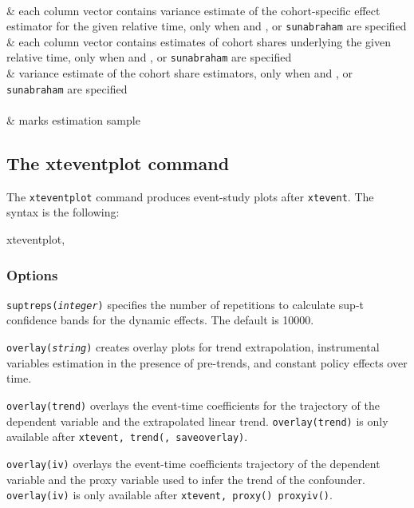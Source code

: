 \documentclass[12pt]{article}
\begin{document}
\begin{stresults2}
	\\
	 & each column vector contains variance estimate of the cohort-specific effect estimator for the given relative time, only when  and , or {\tt sunabraham} are specified
	\\
	 & each column vector contains estimates of cohort shares underlying the given relative time, only when  and , or {\tt sunabraham} are specified
	\\
	 & variance estimate of the cohort share estimators, only when  and , or {\tt sunabraham} are specified
	\\
	 \\
	 & marks estimation sample
	\\
\end{stresults2}

\subsection{The xteventplot command}
The \texttt{xteventplot} command produces event-study plots after \texttt{xtevent}. The syntax is the following:
\begin{stsyntax}
	xteventplot,
\end{stsyntax}

\subsubsection{Options}
\hangpara
\sloppypar \noindent
\texttt{suptreps({\it integer})} specifies the number of repetitions to calculate \citet{montiel2019simultaneous} sup-t confidence bands for the dynamic effects. The default is 10000.

\hangpara
\texttt{overlay({\it string})} creates overlay plots for trend extrapolation, instrumental variables estimation in the presence of pre-trends, and constant policy effects over time.

\morehangpara
\texttt{overlay(trend)} overlays the event-time coefficients for the trajectory of the dependent variable and the extrapolated linear trend.
\texttt{overlay(trend)} is only available after \texttt{xtevent, trend(, saveoverlay)}.

\morehangpara
\texttt{overlay(iv)} overlays the event-time coefficients trajectory of the dependent variable and the proxy variable used to infer the trend of the confounder.
\texttt{overlay(iv)} is only available after \texttt{xtevent, proxy() proxyiv()}.
\end{document}
